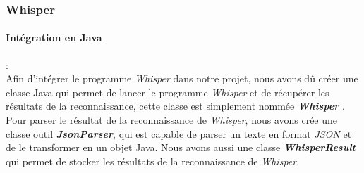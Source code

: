 \subsubsection*{Whisper}
\label{sec:whisperImpl}

\paragraph*{Intégration en Java} : \\

Afin d'intégrer le programme \textit{Whisper} dans notre projet, nous avons dû créer une classe Java qui permet de lancer le programme \textit{Whisper} et de
récupérer les résultats de la reconnaissance, cette classe est simplement nommée \textbf{\textit{Whisper}} . Pour parser le résultat de la reconnaissance de
\textit{Whisper}, nous avons crée une classe outil \textbf{\textit{JsonParser}}, qui est capable de parser un texte en format \textit{JSON} et de le
transformer en un objet Java. Nous avons aussi une classe \textbf{\textit{WhisperResult}} qui permet de stocker les résultats de la reconnaissance de
\textit{Whisper}.